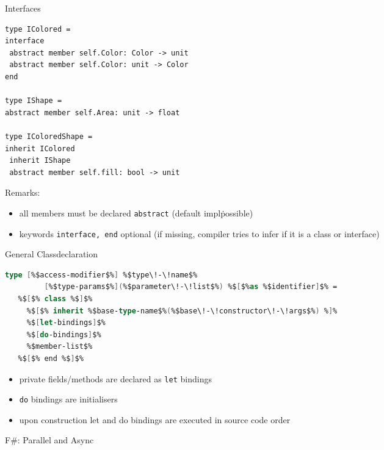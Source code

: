 \documentclass{beamer}
\begin{document}
\begin{frame}[fragile]{Interfaces}
\begin{lstlisting}
type IColored =
interface
 abstract member self.Color: Color -> unit
 abstract member self.Color: unit -> Color
end 

type IShape =
abstract member self.Area: unit -> float

type IColoredShape =
inherit IColored
 inherit IShape
 abstract member self.fill: bool -> unit
\end{lstlisting}

Remarks:
\begin{overlayarea}{\textwidth}{0.3\textheight}
\begin{itemize}
 \item<+-> all members must be declared \lstinline!abstract! (default
   impl\. possible)
 \item<+-> keywords \lstinline!interface, end! optional (if missing,
   compiler tries to infer if it is a class or interface)
\end{itemize}
\end{overlayarea}
\end{frame}

\begin{frame}[fragile]{General Classdeclaration}

\begin{lstlisting}[language=FSharp, escapechar=\%]
type [%$access-modifier$%] %$type\!-\!name$% 
         [%$type-params$%](%$parameter\!-\!list$%) %$[$%as %$identifier]$% =
   %$[$% class %$]$%
     %$[$% inherit %$base-type-name$%(%$base\!-\!constructor\!-\!args$%) %]%
     %$[let-bindings]$%
     %$[do-bindings]$%
     %$member-list$%
   %$[$% end %$]$%
\end{lstlisting}

\begin{itemize}
  \item private fields/methods are declared as \lstinline{let} bindings
  \item \lstinline!do! bindings are initialisers
  \item upon construction let and do bindings are executed in source code order
\end{itemize}
\end{frame}

\begin{frame}{F\#: Parallel and Async}
\end{frame}
\end{document}
